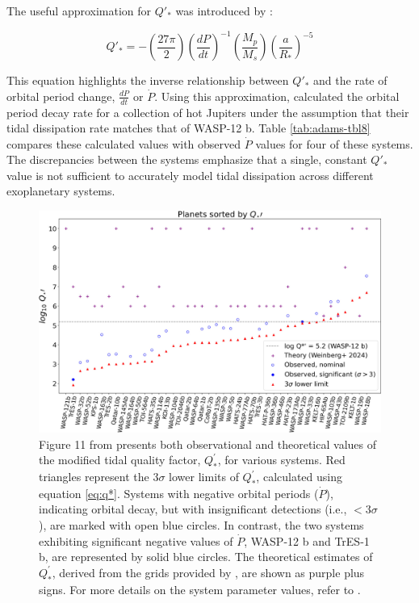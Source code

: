 \documentclass[oneside,12pt]{amsart}
\numberwithin{page}{section}
\begin{document}
The useful approximation for $Q'_*$ was introduced by \citet{goldreich1966q}:

\begin{equation}
    Q'_* = - \left( \frac{27 \pi}{2} \right ) \left( \frac{dP}{dt} \right )^{-1} \left( \frac{M_p}{M_s} \right ) \left( \frac{a}{R_*} \right )^{-5}
\end{equation}\label{eq:q*}

This equation highlights the inverse relationship between $Q'_*$ and the rate of orbital period change, $\frac{dP}{dt}$ or $\dot{P}$. Using this approximation, \citet{adams2024doomed} calculated the orbital period decay rate for a collection of hot Jupiters under the assumption that their tidal dissipation rate matches that of WASP-12 b. Table \ref{tab:adams-tbl8} compares these calculated values with observed $\dot{P}$ values for four of these systems. The discrepancies between the systems emphasize that a single, constant $Q'_*$ value is not sufficient to accurately model tidal dissipation across different exoplanetary systems.

\begin{figure}[htbp]
    \centering
    \includegraphics[width=0.8\linewidth]{figs/adams_fig11.jpg}
    \caption{Figure 11 from \citet{adams2024doomed} presents both observational and theoretical values of the modified tidal quality factor, $Q^{'}_*$, for various systems. Red triangles represent the $3\sigma$ lower limits of $Q^{'}_*$, calculated using equation \ref{eq:q*}. Systems with negative orbital periods ($\dot{P}$), indicating orbital decay, but with insignificant detections (i.e., $<3\sigma$), are marked with open blue circles. In contrast, the two systems exhibiting significant negative values of $\dot{P}$, WASP-12 b and TrES-1 b, are represented by solid blue circles. The theoretical estimates of $Q^{'}_*$, derived from the grids provided by \citet{weinberg2023orbital}, are shown as purple plus signs. For more details on the system parameter values, refer to \citet{adams2024doomed}.}
    \label{fig:adams-fig11}
\end{figure}
\end{document}
